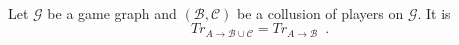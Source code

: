 \begin{theorem} \ \\
  \label{sybil}
  Let $\mathcal{G}$ be a game graph and $\left(\mathcal{B}, \mathcal{C}\right)$ be a collusion of players on
  $\mathcal{G}$. It is
  \begin{equation*}
     Tr_{A \rightarrow \mathcal{B} \cup \mathcal{C}} = Tr_{A \rightarrow \mathcal{B}} \enspace.
  \end{equation*}
\end{theorem}

